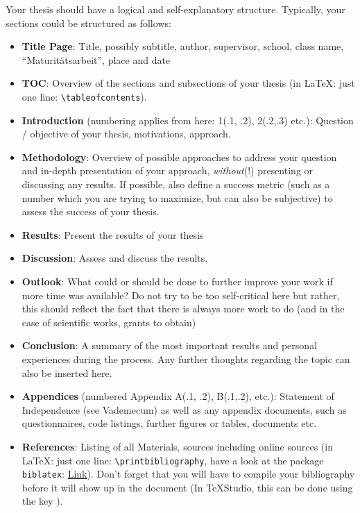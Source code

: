Your thesis should have a logical and self-explanatory structure. Typically, your sections could be structured as follows:
\begin{itemize}
	\item \textbf{Title Page}: Title, possibly subtitle, author, supervisor, school, class name, \enquote{Maturitätsarbeit}, place and date
	\item \textbf{\acrlong{TOC}}: Overview of the sections and subsections of your thesis (in \LaTeX: just one line: \lstinline|\tableofcontents|).
	\item \textbf{Introduction} (numbering applies from here: 1(.1, .2), 2(.2,.3) etc.): Question / objective of your thesis, motivations, approach.
	\item \textbf{Methodology}: Overview of possible approaches to address your question and in-depth presentation of your approach, \textit{without}(!) presenting or discussing any results. If possible, also define a success metric (such as a number which you are trying to maximize, but can also be subjective) to assess the success of your thesis.
	\item \textbf{Results}: Present the results of your thesis
	\item \textbf{Discussion}: Assess and discuss the results.
	\item \textbf{Outlook}: What could or should be done to further improve your work if more time was available? Do not try to be too self-critical here but rather, this should reflect the fact that there is always more work to do (and in the case of scientific works, grants to obtain)
	\item \textbf{Conclusion}: A summary of the most important results and personal experiences during the process. Any further thoughts regarding the topic can also be inserted here.
	\item \textbf{Appendices} (numbered Appendix A(.1, .2), B(.1,.2), etc.): Statement of Independence (see Vademecum) as well as any appendix documents, such as questionnaires, code listings, further figures or tables, documents etc.
	\item \textbf{References}: Listing of all Materials, sources including online sources (in \LaTeX: just one line: \lstinline|\printbibliography|, have a look at the package \lstinline|biblatex|: \href{https://de.overleaf.com/learn/latex/Bibliography_management_with_biblatex}{Link}). Don't forget that you will have to compile your bibliography before it will show up in the document (In TeXStudio, this can be done using the key ).

\end{itemize}
